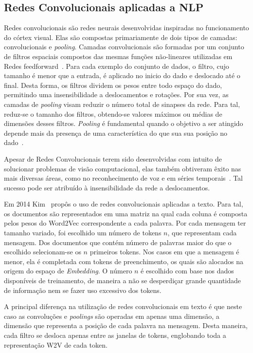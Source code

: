 \subsection{Redes Convolucionais aplicadas a NLP}

Redes convolucionais são redes neurais desenvolvidas inspiradas no funcionamento do córtex visual.
Elas são compostas primariamente de dois tipos de camadas: convolucionais e \textit{pooling}.
Camadas convolucionais são formadas por um conjunto de filtros espaciais compostos das mesmas funções não-lineares
utilizadas em Redes feedforward~\cite{goodfellow16}.
Para cada exemplo do conjunto de dados, o filtro, cujo tamanho é menor que a entrada, é aplicado no inicio do dado e
deslocado até o final.
Desta forma, os filtros dividem os pesos entre todo espaço do dado, permitindo uma insensibilidade a deslocamentos e
rotações.
Por sua vez, as camadas de \textit{pooling} visam reduzir o número total de sinapses da rede.
Para tal, reduz-se o tamanho dos filtros, obtendo-se valores máximos ou médias de dimensões desses filtros.
\textit{Pooling} é fundamental quando o objetivo a ser atingido depende mais da presença de uma característica do que
sua sua posição no dado~\cite{goodfellow16}.

Apesar de Redes Convolucionais terem sido desenvolvidas com intuito de solucionar problemas de visão computacional,
elas também obtiveram êxito nas mais diversas áreas, como no reconhecimento de voz e em séries temporais~\cite{lecun95}.
Tal sucesso pode ser atribuído à insensibilidade da rede a deslocamentos.

Em 2014 Kim~\cite{kim14} propôs o uso de redes convolucionais aplicadas a texto.
Para tal, os documentos são representados em uma matriz na qual cada coluna é composta pelos pesos do Word2Vec
correspondente a cada palavra.
Por cada mensagem ter tamanho variado, foi escolhido um número de tokens $n$, que representam cada mensagem.
Dos documentos que contém número de palavras maior do que o escolhido selecionam-se os $n$ primeiros tokens.
Nos casos em que a mensagem é menor, ela é completada com tokens de preenchimento, os quais são alocados na origem do
espaço de \textit{Embedding}.
O número $n$ é escolhido com base nos dados disponíveis de treinamento, de maneira a não se desperdiçar grande
quantidade de informação nem se fazer uso excessivo dos tokens.

A principal diferença na utilização de redes convolucionais em texto é que neste caso as convoluções e \textit{poolings}
são operadas em apenas uma dimensão, a dimensão que representa a posição de cada palavra na mensagem.
Desta maneira, cada filtro se desloca apenas entre as janelas de tokens, englobando toda a representação W2V de cada
token.

